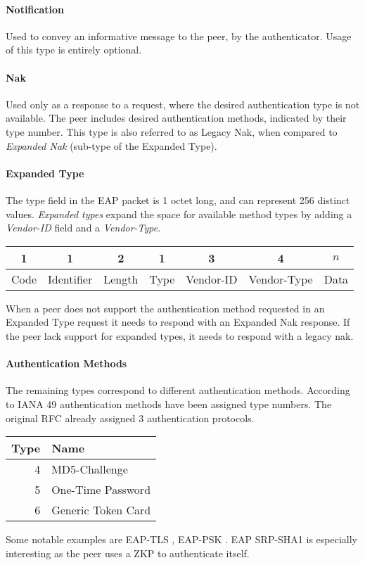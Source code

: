\paragraph{Notification} Used to convey an informative message to the peer, by the authenticator. Usage of this type is entirely optional.

\paragraph{Nak} Used only as a response to a request, where the desired authentication type is not available.
The peer includes desired authentication methods, indicated by their type number.
This type is also referred to as Legacy Nak, when compared to \textit{Expanded Nak} (sub-type of the Expanded Type).

\paragraph{Expanded Type} The type field in the EAP packet is 1 octet long, and can represent 256 distinct values.
\textit{Expanded types} expand the space for available method types by adding a \textit{Vendor-ID} field and a \textit{Vendor-Type}.
\bigskip
\begin{center}
	\begin{tabular}{|c|c|c|c|c|c|c|}
		\hline
		1 & 1 & 2 & 1 & 3 & 4 & $n$\\
		\hline
		Code & Identifier & Length & Type & Vendor-ID & Vendor-Type & Data\\
		\hline
	\end{tabular}
\end{center}
\bigskip
When a peer does not support the authentication method requested in an Expanded Type request it needs to respond with an Expanded Nak response. 
If the peer lack support for expanded types, it needs to respond with a legacy nak.

\paragraph{Authentication Methods}
The remaining types correspond to different authentication methods.
According to IANA \cite{joseph2004eap} 49 authentication methods have been assigned type numbers.
The original RFC \cite{aboba2004extensible} already assigned 3 authentication protocols.
\bigskip
\newline
\begin{tabular}{rl}
	Type & Name\\
	\hline
	4 & MD5-Challenge\\
	5 & One-Time Password\\
	6 & Generic Token Card\\
\end{tabular}
\bigskip
\newline
Some notable examples are EAP-TLS \cite{simon2008eap}, EAP-PSK \cite{bersani2007eap}.
EAP SRP-SHA1 \cite{carlson135eap} is especially interesting as the peer uses a ZKP to authenticate itself.

